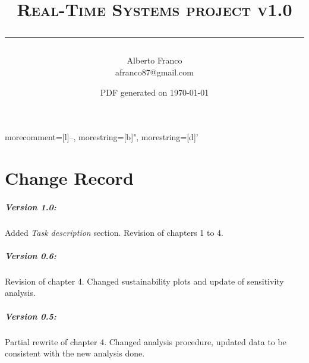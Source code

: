 \documentclass[10pt,a4paper]{report}
\begin{document}
\title {
    \scshape
    \huge 
        Real-Time Systems project v1.0\\[5mm]
        \hrule
}
\author {
    \textsf{Alberto Franco} \\
    \textsf{afranco87@gmail.com}
}
\date {
    \sffamily
    \small
    PDF generated on \today
}
\maketitle %


\lstset{language=Ada}
\lstset{showstringspaces=false}

\lstset{firstnumber=last}

  {morecomment=[l]{--},
   morestring=[b]",
   morestring=[d]'
  }

\setcounter{page}{1}

\tableofcontents
\newpage

\chapter*{Change Record}

\paragraph{Version 1.0:}
Added \emph{Task description} section. Revision of chapters 1 to 4. 

\paragraph{Version 0.6:}
Revision of chapter 4. Changed sustainability plots and update of sensitivity 
analysis. 

\paragraph{Version 0.5:}
Partial rewrite of chapter 4. Changed analysis procedure, updated data to be 
consistent with the new analysis done. 
\end{document}
